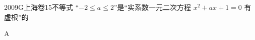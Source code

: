 
\begin{problem}{2009}{G}{上海卷}{15}{不等式}
“$ -2\leq a\leq 2 $”是“实系数一元二次方程 $ x^2+ax+1=0 $ 有虚根”的
\begin{choices}
\end{choices}
\end{problem}

\begin{answer}
A
\end{answer}

\begin{solutions}

\end{solutions}